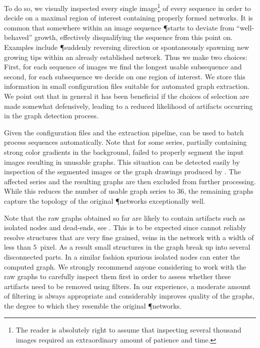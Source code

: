 		To do so, we visually inspected every single image\footnote{The reader is absolutely right to assume that inspecting several thousand images required an extraordinary amount of patience and time.} of every sequence in order to decide on a maximal region of interest containing properly formed networks. It is common that somewhere within an image sequence \P starts to deviate from ``well-behaved'' growth, effectively disqualifying the sequence from this point on. Examples include \P suddenly reversing direction or spontaneously spawning new growing tips within an already established network. Thus we make two choices: First, for each sequence of images we find the longest usable subsequence and second, for each subsequence we decide on one region of interest. We store this information in small configuration files suitable for automated graph extraction. We point out that in general it has been beneficial if the choices of selection are made somewhat defensively, leading to a reduced likelihood of artifacts occurring in the graph detection process.  

		Given the configuration files and the extraction pipeline, \NEFI can be used to batch process sequences automatically. Note that for some series, partially containing strong color gradients in the background, \NEFI failed to properly segment the input images resulting in unusable graphs. This situation can be detected easily by inspection of the segmented images or the graph drawings produced by \NEFI. The affected series and the resulting graphs are then excluded from further processing. While this reduces the number of usable graph series to $36$, the remaining graphs capture the topology of the original \P networks exceptionally well. 

		Note that the raw graphs obtained so far are likely to contain artifacts such as isolated nodes and dead-ends, see . This is to be expected since \NEFI cannot reliably resolve structures that are very fine grained, \eg veins in the network with a width of less than $5$~pixel. As a result small structures in the graph break up into several disconnected parts. In a similar fashion spurious isolated nodes can enter the computed graph. We strongly recommend anyone considering to work with the raw graphs to carefully inspect them first in order to assess whether these artifacts need to be removed using filters. In our experience, a moderate amount of filtering is always appropriate and considerably improves quality of the graphs, \ie the degree to which they resemble the original \P networks.

